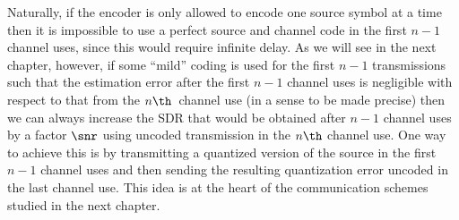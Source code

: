 Naturally, if the encoder is only allowed to encode one source symbol at a time
then it is impossible to use a perfect source and channel code in the first
$n-1$ channel uses, since this would require infinite delay. As we will see in
the next chapter, however, if some ``mild'' coding is used for the first $n-1$
transmissions such that the estimation error after the first $n-1$ channel uses
is negligible with respect to that from the $n\th$~channel use (in a sense to be
made precise) then we can always increase the SDR that would be obtained after
$n-1$ channel uses by a factor $\snr$ using uncoded transmission in the $n\th$
channel use. One way to achieve this is by transmitting a quantized version of
the source in the first $n-1$ channel uses and then sending the resulting
quantization error uncoded in the last channel use. This idea is at the heart of
the communication schemes studied in the next chapter.




